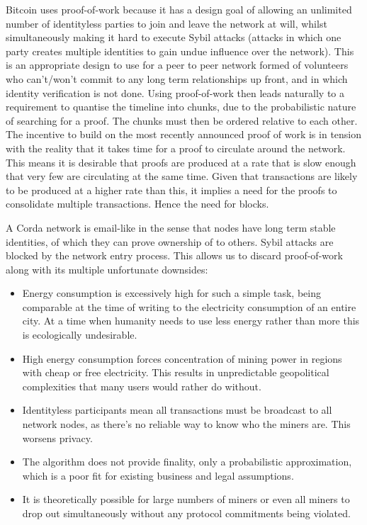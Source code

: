 \documentclass{article}
\begin{document}
Bitcoin uses proof-of-work because it has a design goal of allowing an unlimited number of identityless parties to join
and leave the network at will, whilst simultaneously making it hard to execute Sybil attacks (attacks in which one party
creates multiple identities to gain undue influence over the network). This is an appropriate design to use for a peer to
peer network formed of volunteers who can't/won't commit to any long term relationships up front, and in which identity
verification is not done. Using proof-of-work then leads naturally to a requirement to quantise the timeline into chunks,
due to the probabilistic nature of searching for a proof. The chunks must then be ordered relative to each other.
The incentive to build on the most recently announced proof of work is in tension with the reality that it takes
time for a proof to circulate around the network. This means it is desirable that proofs are produced at a rate
that is slow enough that very few are circulating at the same time. Given that transactions are likely to be
produced at a higher rate than this, it implies a need for the proofs to consolidate multiple transactions.
Hence the need for blocks.

A Corda network is email-like in the sense that nodes have long term stable identities, of which they can prove ownership
of to others. Sybil attacks are blocked by the network entry process. This allows us to discard proof-of-work along with
its multiple unfortunate downsides:

\begin{itemize}
\item Energy consumption is excessively high for such a simple task, being comparable at the time of writing to the
electricity consumption of an entire city\cite{BitcoinEnergy}. At a time when humanity needs to use less energy
rather than more this is ecologically undesirable.
\item High energy consumption forces concentration of mining power in regions with cheap or free electricity. This results
in unpredictable geopolitical complexities that many users would rather do without.
\item Identityless participants mean all transactions must be broadcast to all network nodes, as there's no reliable
way to know who the miners are. This worsens privacy.
\item The algorithm does not provide finality, only a probabilistic approximation, which is a poor fit for existing
business and legal assumptions.\cite{Swanson}
\item It is theoretically possible for large numbers of miners or even all miners to drop out simultaneously without
any protocol commitments being violated.
\end{itemize}
\end{document}
